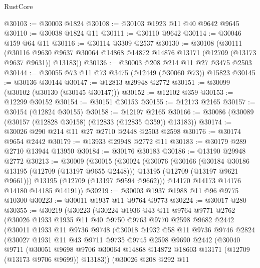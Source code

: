 \begin{lexlean}{RustCore}
\begin{coremodule}
@30103 := @30003 @1824
@30108 := @30103 @1923 @11 @40 @9642 @9645
@30110 := @30038 @1824 @11
@30111 := @30110 @9642
@30114 := @30046 @159 @64 @11
@30116 := @30114 @3309 @2537
@30130 := @30108
    (@30111
      (@30116 @9630 @9637 @30064 @14868 @14872 @14876 @13171 (@12709 (@13173 @9637 @9631)) @13183))
@30136 := @30003 @208 @214 @11 @27 @3475 @2503
@30144 := @30055 @73 @11 @73 @3475 (@12449 (@30060 @73)) @15823
@30145 := @30136 @30144
@30147 := @12813 @29948 @2772
@30151 := @30099 (@30102 (@30130 (@30145 @30147)))
@30152 := @12102 @359
@30153 := @12299 @30152
@30154 := @30151 @30153
@30155 := @12173 @2165
@30157 := @30154 (@12824 @30155)
@30158 := @12197 @2165
@30166 := @30086 (@30089 (@30157 (@12828 @30158) (@12833 (@12835 @359)) @13183))
@30174 := @30026 @290 @214 @11 @27 @2710 @2448 @2503 @2598
@30176 := @30174 @9654 @2442
@30179 := @13933 @29948 @2772 @11
@30183 := @30179 @289 @2710 @13944 @13950
@30184 := @30176 @30183
@30186 := @13190 @29948 @2772
@30213 := @30009
    (@30015
      (@30024
        (@30076
          (@30166
            (@30184 @30186 @13195 (@12709 (@13197 @9655 @2448)))
            @13195
            (@12709 (@13197 @9621 @9661)))
          @13195
          (@12709 (@13197 @9594 @9662)))
        @14170
        @14173
        @14176
        @14180
        @14185
        @14191))
@30219 := @30003 @1937 @1988 @11 @96 @9775 @10300
@30223 := @30011 @1937 @11 @9764 @9773
@30224 := @30017 @280
@30355 := @30219
    (@30223
      (@30224
        @1936
        @43
        @11
        @9764
        @9771
        @2762
        (@30026
          @1933
          @1935
          @11
          @40
          @9750
          @9763
          @9770
          @2598
          @9682
          @2442
          (@30011
            @1933
            @11
            @9736
            @9748
            (@30018
              @1932
              @58
              @11
              @9736
              @9746
              @2824
              (@30027
                @1931
                @11
                @43
                @9711
                @9735
                @9745
                @2598
                @9690
                @2442
                (@30040
                  @9711
                  (@30051
                    @9698
                    @9706
                    @30064
                    @14868
                    @14872
                    @18603
                    @13171
                    (@12709 (@13173 @9706 @9699))
                    @13183))
                (@30026
                  @208
                  @292
                  @11

\end{coremodule}
\end{lexlean}
